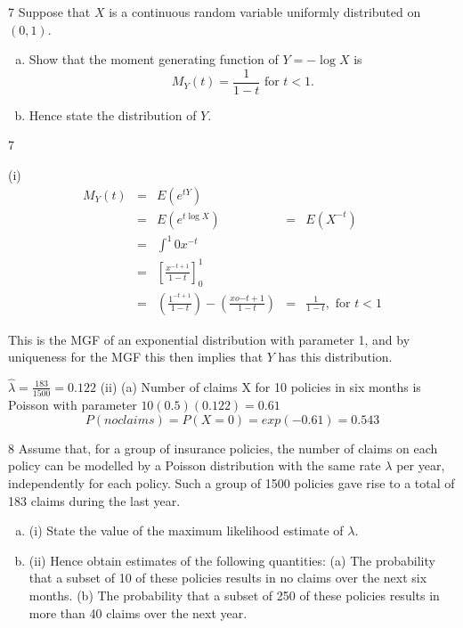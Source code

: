 \item 7 Suppose that $X$ is a continuous random variable uniformly distributed on $(0, 1)$.
\begin{enumerate}[(a)]
    \item  Show that the moment generating function of $Y = - \log X$ is
\[M_Y(t) = \frac{1}{1 - t} \mbox{ for } t < 1.\] 
    \item Hence state the distribution of $Y$. 
\end{enumerate}

7 

(i)
\begin{eqnarray*}
M_Y( t ) &=& E ( e^{tY} ) \\ 
&=& E ( e^{t\log X} )
&=& E(X^{-t}) \\
&=& \int^{1}{0} x^{-t}\\
&=& \left[ \frac{x^{-t+1}}{1-t}\right]^{1}_{0} \\
&=& \left(  \frac{1^{-t+1}}{1-t}\right) - \left( \frac{xo{-t+1}}{1-t}\right)
&=& \frac{1}{1-t}, \mbox{ for } t < 1
\end{eqnarray*}

This is the MGF of an exponential distribution with parameter 1, and by
uniqueness for the MGF this then implies that $Y$ has this distribution.




$ \hat{\lambda} = \frac{183}{1500} = 0.122$
(ii) (a)
Number of claims X for 10 policies in six months is Poisson with
parameter $10(0.5)(0.122) = 0.61$
\[P(no claims) = P(X = 0) = exp(-0.61) = 0.543\]

\item 8 Assume that, for a group of insurance policies, the number of claims on each policy
can be modelled by a Poisson distribution with the same rate $\lambda$ per year,
independently for each policy. Such a group of 1500 policies gave rise to a total of
183 claims during the last year.
\begin{enumerate}[(a)]
    \item (i) State the value of the maximum likelihood estimate of $\lambda$.
\item (ii) Hence obtain estimates of the following quantities:
(a) The probability that a subset of 10 of these policies results in no claims
over the next six months.
(b) The probability that a subset of 250 of these policies results in more
than 40 claims over the next year. 
\end{enumerate}

